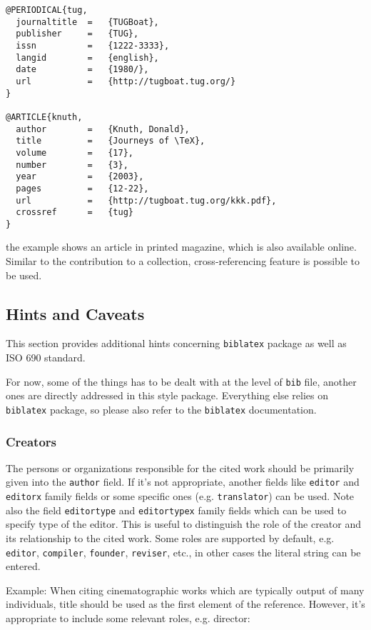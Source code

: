 \documentclass[a4paper,10pt]{ltxdockit}
\def\t|#1|{\texttt{#1}}
\def\c#1{%
\hangpara{3em}{1}%
\fullcite{#1}}
\begin{document}
\c{knuth}
\begin{verbatim}
@PERIODICAL{tug,
  journaltitle  =   {TUGBoat},
  publisher     =   {TUG},
  issn          =   {1222-3333},
  langid        =   {english},
  date          =   {1980/},
  url           =   {http://tugboat.tug.org/}
}

@ARTICLE{knuth,
  author        =   {Knuth, Donald},
  title         =   {Journeys of \TeX},
  volume        =   {17},
  number        =   {3},
  year          =   {2003},
  pages         =   {12-22},
  url           =   {http://tugboat.tug.org/kkk.pdf},
  crossref      =   {tug}
}
\end{verbatim}

\noindent the example shows an article in printed magazine, which is also
available online. Similar to the contribution to a collection,
cross-referencing feature is possible to be used.

\subsection{Hints and Caveats}

This section provides additional hints concerning \t|biblatex| package
as well as ISO 690 standard.

For now, some of the things has to be dealt with at the level of \t|bib|
file, another ones are directly addressed in this style package.
Everything else relies on \t|biblatex| package, so please also refer
to the \t|biblatex| documentation.

\subsubsection{Creators}

The persons or organizations responsible for the cited work should be
primarily given into the \t|author| field. If it's not appropriate,
another fields like \t|editor| and \t|editorx| family fields or some
specific ones (e.g. \t|translator|) can be used. Note also the field
\t|editortype| and \t|editortypex| family fields which can be used
to specify type of the editor. This is useful to distinguish the role
of the creator and its relationship to the cited work. Some roles
are supported by default, e.g. \t|editor|, \t|compiler|, \t|founder|,
\t|reviser|, etc., in other cases the literal string can be entered.

Example:
When citing cinematographic works which are typically output of many
individuals, title should be used as the first element of the reference.
However, it's appropriate to include some relevant roles, e.g. director:
\end{document}
